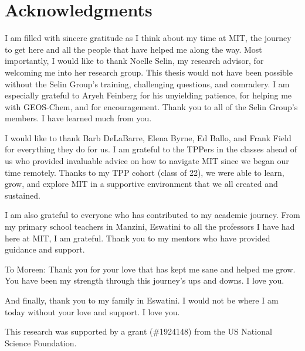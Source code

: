 \cleardoublepage
\setcounter{savepage}{\thepage}
\begin{abstractpage}

\end{abstractpage}

% 

\cleardoublepage

\section*{Acknowledgments}
\begin{flushleft}
   I am filled with sincere gratitude as I think about my time at MIT, the journey to get here and all the people that have helped me along the way. Most importantly, I would like to thank Noelle Selin, my research advisor, for welcoming me into her research group.  
   This thesis would not have been possible without the Selin Group's training, challenging questions, and comradery. I am especially grateful to Aryeh Feinberg for his unyielding patience, for helping me with GEOS-Chem, and for encouragement. Thank you to all of the Selin Group's members. I have learned much from you.
       
\end{flushleft}
    
\begin{flushleft}
I would like to thank Barb DeLaBarre, Elena Byrne, Ed Ballo, and Frank Field for everything they do for us. I am grateful to the TPPers in the classes ahead of us who provided invaluable advice on how to navigate MIT since we began our time remotely. Thanks to my TPP cohort (class of 22), we were able to learn, grow, and explore MIT in a supportive environment that we all created and sustained. 
\end{flushleft} 
\begin{flushleft}
I am also grateful to everyone who has contributed to my academic journey. From my primary school teachers in Manzini, Eswatini to all the professors I have had here at MIT, I am grateful. Thank you to my mentors who have provided guidance and support. 
\end{flushleft} 
\begin{flushleft}
    To Moreen: Thank you for your love that has kept me sane and helped me grow. You have been my strength through this journey's ups and downs. I love you.
 \end{flushleft}   
 \begin{flushleft}
    And finally, thank you to my family in Eswatini. I would not be where I am today without your love and support. I love you.
\end{flushleft} 

\begin{flushleft}
    This research was supported by a grant (\#1924148) from the US National Science Foundation.
\end{flushleft} 

